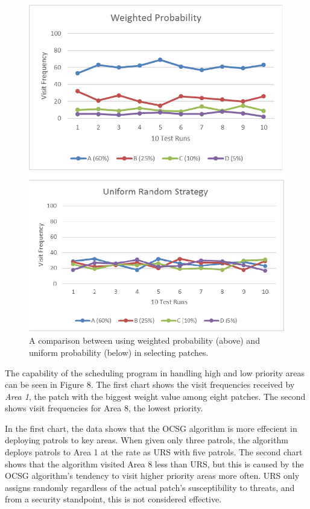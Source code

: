 \documentclass[journal]{./IEEE/IEEEtran}
\begin{document}
\begin{figure}[h]
\begin{center}
\includegraphics[scale=0.4]{./Images/OCSG_URS_Demo.png}
\caption{A comparison between using weighted probability (above) and uniform probability (below) in selecting patches.}
\end{center}
\end{figure}

The capability of the scheduling program in handling high and low priority areas can be seen in Figure 8. The first chart shows the visit frequencies received by \textit{Area 1}, the patch with the biggest weight value among eight patches. The second shows visit frequencies for Area 8, the lowest priority.

In the first chart, the data shows that the OCSG algorithm is more effecient in deploying patrols to key areas. When given only three patrols, the algorithm deploys patrols to Area 1 at the rate as URS with five patrols. The second chart shows that the algorithm visited Area 8 less than URS, but this is caused by the OCSG algorithm's tendency to visit higher priority areas more often. URS only assigns randomly regardless of the actual patch's susceptibility to threats, and from a security standpoint, this is not considered effective.
\end{document}
